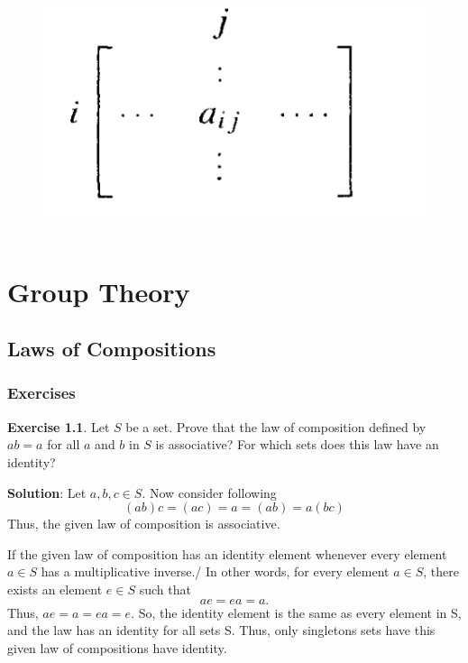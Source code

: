 \documentclass[
]{book}
\theoremstyle{definition}
\theoremstyle{definition}
\theoremstyle{definition}
\newtheorem{exercise}{Exercise}[chapter]
\theoremstyle{definition}
\theoremstyle{remark}
\begin{document}
\begin{figure}
\centering
\includegraphics{figures/ch_1/fig02.png}
\caption{\label{fig:fig02}\(~\)}
\end{figure}

\hypertarget{group-theory}{%
\chapter{Group Theory}\label{group-theory}}

\hypertarget{laws-of-compositions}{%
\section{Laws of Compositions}\label{laws-of-compositions}}

\hypertarget{exercises}{%
\subsection{Exercises}\label{exercises}}

\begin{exercise}
\protect\hypertarget{exr:unnamed-chunk-2}{}\label{exr:unnamed-chunk-2}Let \(S\) be a set. Prove that the law of composition defined by \(ab = a\) for all \(a\) and \(b\) in \(S\) is associative? For which sets does this law have an identity?
\end{exercise}

\textbf{Solution}: Let \(a,b,c\in S\).
Now consider following
\[(ab)c=(ac)=a=(ab)=a(bc)\]
Thus, the given law of composition is associative.

If the given law of composition has an identity element whenever every element \(a\in S\) has a multiplicative inverse./
In other words, for every element \(a\in S\), there exists an element \(e \in S\) such that \[ae = ea = a.\]
Thus, \(ae=a=ea=e\). So, the identity element is the same as every element in S, and the law has an identity for all sets S. Thus, only singletons sets have this given law of compositions have identity.
\end{document}
